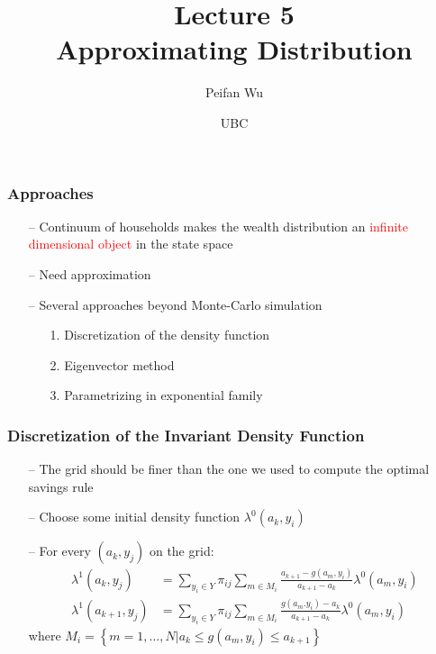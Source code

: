 \documentclass[aspectratio=169, 11pt]{beamer}
\begin{document}
\title{Lecture 5 \\ Approximating Distribution}
\author[Wu]{Peifan Wu}
\date{UBC}

\begin{frame}
\titlepage
\end{frame}

\begin{frame}
\frametitle{Approaches}
  \begin{itemize}
    \item[--] Continuum of households makes the wealth distribution an \textcolor{red}{infinite dimensional object} in the state space
    \item[--] Need approximation
    \bigskip
    \item[--] Several approaches beyond Monte-Carlo simulation
    \begin{itemize}
      \item[1.] Discretization of the density function
      \item[2.] Eigenvector method
      \item[3.] Parametrizing in exponential family
    \end{itemize}
  \end{itemize}
\end{frame}

\begin{frame}
\frametitle{Discretization of the Invariant Density Function}
  \begin{itemize}
    \item[--] The grid should be finer than the one we used to compute the optimal savings rule
    \bigskip
    \item[--] Choose some initial density function $\lambda^{0}\left(a_{k},y_{i}\right)$
    \bigskip
    \item[--] For every $\left(a_{k},y_{j}\right)$ on the grid:
    \begin{align*}
      \lambda^{1}\left(a_{k},y_{j}\right) & =\sum_{y_{i}\in Y}\pi_{ij}\sum_{m\in M_{i}}\frac{a_{k+1}-g\left(a_{m},y_{i}\right)}{a_{k+1}-a_{k}}\lambda^{0}\left(a_{m},y_{i}\right)\\
      \lambda^{1}\left(a_{k+1},y_{j}\right) & =\sum_{y_{i}\in Y}\pi_{ij}\sum_{m\in M_{i}}\frac{g\left(a_{m}.y_{i}\right)-a_{k}}{a_{k+1}-a_{k}}\lambda^{0}\left(a_{m},y_{i}\right)
    \end{align*}
    where $M_{i}=\left\{ m=1,\ldots,N|a_{k}\leqslant g\left(a_{m},y_{i}\right)\leqslant a_{k+1}\right\}$
    \bigskip
  \end{itemize}
\end{frame}
\end{document}
